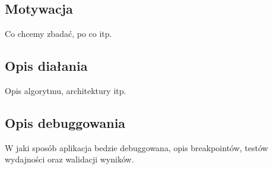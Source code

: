 \subsection{Motywacja}

Co chcemy zbadać, po co itp.

\subsection{Opis diałania}

Opis algorytmu, architektury itp.

\subsection{Opis debuggowania}

W jaki sposób aplikacja bedzie debuggowana, opis breakpointów, testów wydajności oraz walidacji wyników.



